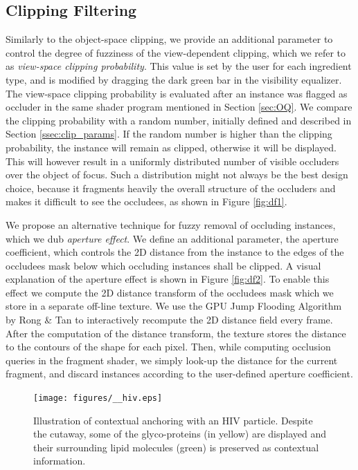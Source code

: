 \subsection{Clipping Filtering}

Similarly to the object-space clipping, we provide an additional parameter to control the degree of fuzziness of the view-dependent clipping, which we refer to as \emph{view-space clipping probability}.
This value is set by the user for each ingredient type, and is modified by dragging the dark green bar in the visibility equalizer.
The view-space clipping probability is evaluated after an instance was flagged as occluder in the same shader program mentioned in Section \ref{sec:OQ}.
We compare the clipping probability with a random number, initially defined and described in Section \ref{ssec:clip_params}.
If the random number is higher than the clipping probability, the instance will remain as clipped, otherwise it will be displayed. 
This will however result in a uniformly distributed number of visible occluders over the object of focus. 
Such a distribution might not always be the best design choice, because it fragments heavily the overall structure of the occluders and makes it difficult to see the occludees, as shown in Figure \ref{fig:df1}.

We propose an alternative technique for fuzzy removal of occluding instances, which we dub \emph{aperture effect}.
We define an additional parameter, the aperture coefficient, which controls the 2D distance from the instance to the edges of the occludees mask below which occluding instances shall be clipped.
A visual explanation of the aperture effect is shown in Figure \ref{fig:df2}.
To enable this effect we compute the 2D distance transform of the occludees mask which we store in a separate off-line texture.
We use the GPU Jump Flooding Algorithm by Rong \& Tan \cite{Rong06} to interactively recompute the 2D distance field every frame. 
After the computation of the distance transform, the texture stores the distance to the contours of the shape for each pixel.
Then, while computing occlusion queries in the fragment shader, we simply look-up the distance for the current fragment, and discard instances according to the user-defined aperture coefficient.



\begin{figure}[t]
\centering
\texttt{[image: figures/\_\_hiv.eps]}
\caption{\label{fig:hiv-islands} 
Illustration of contextual anchoring with an HIV particle. 
Despite the cutaway, some of the glyco-proteins (in yellow) are displayed and their surrounding lipid molecules (green) is preserved as contextual information.}
\vspace{-5mm}
\end{figure}

